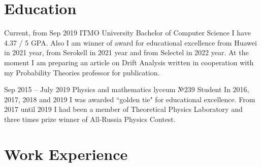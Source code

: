 \documentclass[
	10pt, %
]{FreemanCV}
\begin{document}
\begin{paracol}{2}
\section{Education} 






\jobentry
	{Current, from Sep 2019} %
	{} %
	{ITMO University} %
	{Bachelor of Computer Science} %
	{I have 4.37 / 5 GPA. Also I am winner of award for educational excellence from Huawei in 2021 year, from Serokell in 2021 year and from Selectel in 2022 year.  At the moment I am preparing an article on Drift Analysis written in cooperation with my Probability Theories professor for publication.} %


\jobentry
	{Sep 2015 -- July 2019} %
	{} %
	{Physics and mathematics lyceum №239} %
	{Student} %
	{In 2016, 2017, 2018 and 2019 I was awarded ``golden tie" for educational excellence. From 2017 until 2019 I had been a member of Theoretical Physics Laboratory and three times prize winner of All-Russia Physics Contest.} %



\medskip

\section{Work Experience}





\end{paracol}
\end{document}
